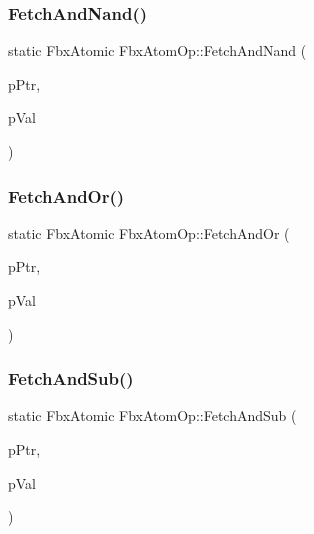 \mbox{\label{class_fbx_atom_op_a21483c95a1d27b79dbdc70c8c9cd25f2}} 
\subsubsection{\texorpdfstring{Fetch\+And\+Nand()}{FetchAndNand()}}
{\footnotesize\ttfamily static Fbx\+Atomic Fbx\+Atom\+Op\+::\+Fetch\+And\+Nand (\begin{DoxyParamCaption}\item[{volatile Fbx\+Atomic $\ast$}]{p\+Ptr,  }\item[{Fbx\+Atomic}]{p\+Val }\end{DoxyParamCaption})\hspace{0.3cm}{\ttfamily [static]}}

\mbox{\label{class_fbx_atom_op_ab02a669c407687e914a2b373f1b66d69}} 
\subsubsection{\texorpdfstring{Fetch\+And\+Or()}{FetchAndOr()}}
{\footnotesize\ttfamily static Fbx\+Atomic Fbx\+Atom\+Op\+::\+Fetch\+And\+Or (\begin{DoxyParamCaption}\item[{volatile Fbx\+Atomic $\ast$}]{p\+Ptr,  }\item[{Fbx\+Atomic}]{p\+Val }\end{DoxyParamCaption})\hspace{0.3cm}{\ttfamily [static]}}

\mbox{\label{class_fbx_atom_op_a05cd6e4895f7459453464434728de7c3}} 
\subsubsection{\texorpdfstring{Fetch\+And\+Sub()}{FetchAndSub()}}
{\footnotesize\ttfamily static Fbx\+Atomic Fbx\+Atom\+Op\+::\+Fetch\+And\+Sub (\begin{DoxyParamCaption}\item[{volatile Fbx\+Atomic $\ast$}]{p\+Ptr,  }\item[{Fbx\+Atomic}]{p\+Val }\end{DoxyParamCaption})\hspace{0.3cm}{\ttfamily [static]}}

